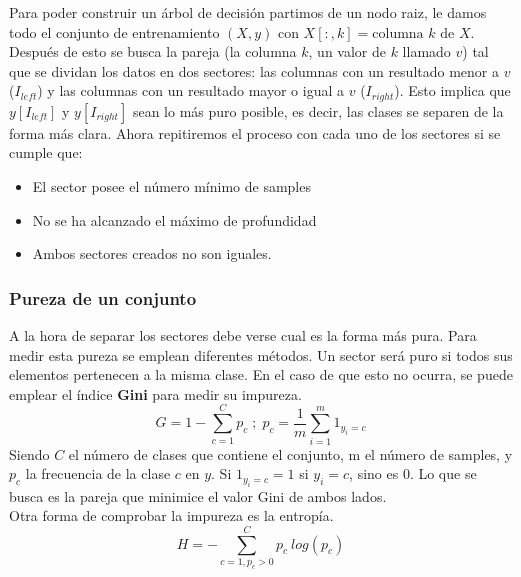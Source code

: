 \documentclass[11pt]{article}
\theoremstyle{plain}
\begin{document}
            Para poder construir un árbol de decisión partimos de un nodo raiz, le damos todo el conjunto de entrenamiento $(X,y)$ con $X[:,k] = \text{columna $k$ de $X$}$. Después de esto se busca la pareja (la columna $k$, un valor de $k$ llamado $v$) tal que se dividan los datos en dos sectores: las columnas con un resultado menor a $v$ ($I_{left}$) y las columnas con un resultado mayor o igual a $v$ ($I_{right}$). Esto implica que $y[I_{left}]$ y $y[I_{right}]$ sean lo más puro posible, es decir, las clases se separen de la forma más clara. Ahora repitiremos el proceso con cada uno de los sectores si se cumple que:
            \begin{itemize}
                \item El sector posee el número mínimo de samples
                \item No se ha alcanzado el máximo de profundidad
                \item Ambos sectores creados no son iguales. 
            \end{itemize}

            \subsubsection{Pureza de un conjunto} %
            \label{subsub:pureza_de_un_conjunto}
                A la hora de separar los sectores debe verse cual es la forma más pura. Para medir esta pureza se emplean diferentes métodos. Un sector será puro si todos sus elementos pertenecen a la misma clase. En el caso de que esto no ocurra, se puede emplear el índice \textbf{Gini} para medir su impureza.
                \begin{equation}
                    G = 1 - \sum_{c=1}^{C} p_c  \; {;} \;  p_c = \frac{1}{m} \sum_{i=1}^{m} 1_{y_i = c}
                \end{equation}
                Siendo $C$ el número de clases que contiene el conjunto, m el número de samples, y $p_c$ la frecuencia de la clase $c$ en $y$. Si $1_{y_i =  c} = 1$ si $y_i = c$, sino es 0. Lo que se busca es la pareja que minimice el valor Gini de ambos lados.\\

                Otra forma de comprobar la impureza es la entropía.
                \begin{equation}
                     H = - \sum_{c = 1, p_c > 0}^{C} p_c \ log(p_c)
                 \end{equation} 
\end{document}

